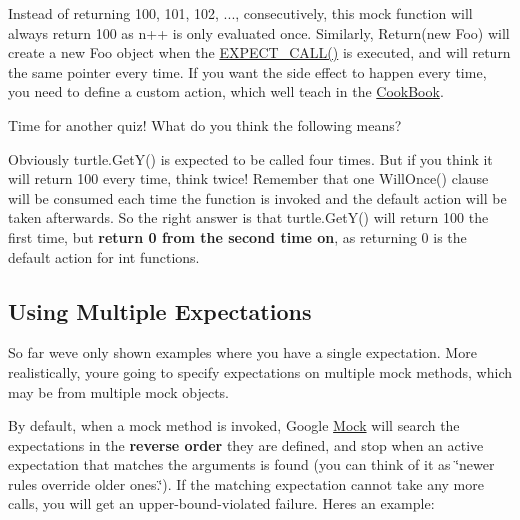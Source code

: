 Instead of returning 100, 101, 102, ..., consecutively, this mock function will always return 100 as {\ttfamily n++} is only evaluated once. Similarly, {\ttfamily Return(new Foo)} will create a new {\ttfamily Foo} object when the {\ttfamily \mbox{\hyperlink{gmock-spec-builders_8h_a535a6156de72c1a2e25a127e38ee5232}{E\+X\+P\+E\+C\+T\+\_\+\+C\+A\+L\+L()}}} is executed, and will return the same pointer every time. If you want the side effect to happen every time, you need to define a custom action, which we\textquotesingle{}ll teach in the \mbox{\hyperlink{CookBook_8md}{Cook\+Book}}.

Time for another quiz! What do you think the following means?


\begin{DoxyCode}{0}
\end{DoxyCode}


Obviously {\ttfamily turtle.\+Get\+Y()} is expected to be called four times. But if you think it will return 100 every time, think twice! Remember that one {\ttfamily Will\+Once()} clause will be consumed each time the function is invoked and the default action will be taken afterwards. So the right answer is that {\ttfamily turtle.\+Get\+Y()} will return 100 the first time, but {\bfseries{return 0 from the second time on}}, as returning 0 is the default action for {\ttfamily int} functions.

\subsection*{Using Multiple Expectations}

So far we\textquotesingle{}ve only shown examples where you have a single expectation. More realistically, you\textquotesingle{}re going to specify expectations on multiple mock methods, which may be from multiple mock objects.

By default, when a mock method is invoked, Google \mbox{\hyperlink{classMock}{Mock}} will search the expectations in the {\bfseries{reverse order}} they are defined, and stop when an active expectation that matches the arguments is found (you can think of it as \char`\"{}newer rules override older ones.\char`\"{}). If the matching expectation cannot take any more calls, you will get an upper-\/bound-\/violated failure. Here\textquotesingle{}s an example\+:


